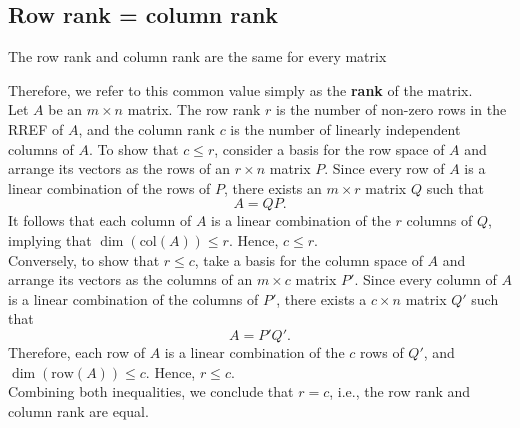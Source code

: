 \documentclass[a4paper, 9pt]{extarticle}
\begin{document}
\subsection{Row rank = column rank}
\begin{theorembox}{}{}
  The row rank and column rank are the same for every matrix
\end{theorembox}
\noindent
Therefore, we refer to this common value simply as the \textbf{rank} of the matrix. \\[2ex]
Let $A$ be an $m \times n$ matrix. The row rank $r$ is the number of non-zero rows in the RREF of $A$, and the column rank $c$ is the number of linearly independent columns of $A$.
To show that $c \leq r$, consider a basis for the row space of $A$ and arrange its vectors as the rows of an $r \times n$ matrix $P$. Since every row of $A$ is a linear combination of the rows of $P$, there exists an $m \times r$ matrix $Q$ such that
$$
  A = QP.
$$
It follows that each column of $A$ is a linear combination of the $r$ columns of $Q$, implying that $\dim(\text{col}(A)) \leq r$. Hence, $c \leq r$. \\
Conversely, to show that $r \leq c$, take a basis for the column space of $A$ and arrange its vectors as the columns of an $m \times c$ matrix $P'$. Since every column of $A$ is a linear combination of the columns of $P'$, there exists a $c \times n$ matrix $Q'$ such that
$$
  A = P'Q'.
$$
Therefore, each row of $A$ is a linear combination of the $c$ rows of $Q'$, and $\dim(\text{row}(A)) \leq c$. Hence, $r \leq c$. \\
Combining both inequalities, we conclude that $r = c$, i.e., the row rank and column rank are equal.
\end{document}

